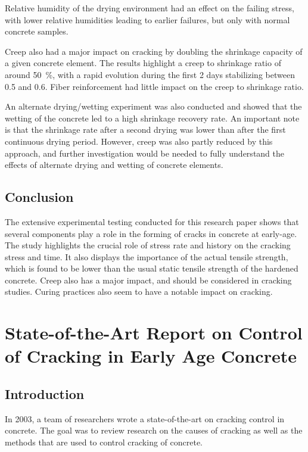\documentclass[a4paper,11pt]{memoir}
\begin{document}
Relative humidity of the drying environment had an effect on the failing
stress, with lower relative humidities leading to earlier failures, but only
with normal concrete samples.

Creep also had a major impact on cracking by doubling the shrinkage capacity of
a given concrete element. The results highlight a creep to shrinkage ratio of
around \SI{50}{\percent}, with a rapid evolution during the first 2 days
stabilizing between \num{0.5} and \num{.6}. Fiber reinforcement had little
impact on the creep to shrinkage ratio.

An alternate drying/wetting experiment was also conducted and showed that the
wetting of the concrete led to a high shrinkage recovery rate. An important
note is that the shrinkage rate after a second drying was lower than after the
first continuous drying period. However, creep was also partly reduced by this
approach, and further investigation would be needed to fully understand the
effects of alternate drying and wetting of concrete elements.

\subsection{Conclusion}
The extensive experimental testing conducted for this research paper shows that
several components play a role in the forming of cracks in concrete at
early-age. The study highlights the crucial role of stress rate and history on
the cracking stress and time. It also displays the importance of the actual
tensile strength, which is found to be lower than the usual static tensile
strength of the hardened concrete. Creep also has a major impact, and should be
considered in cracking studies. Curing practices also seem to have a notable
impact on cracking.

\section[State-of-the-Art Report on Control of Cracking in Early Age Concrete]
{State-of-the-Art Report on Control of Cracking in Early Age Concrete \cite{soa}}

\subsection{Introduction}
In 2003, a team of researchers wrote a state-of-the-art on cracking control in
concrete. The goal was to review research on the causes of cracking as well as
the methods that are used to control cracking of concrete.
\end{document}
